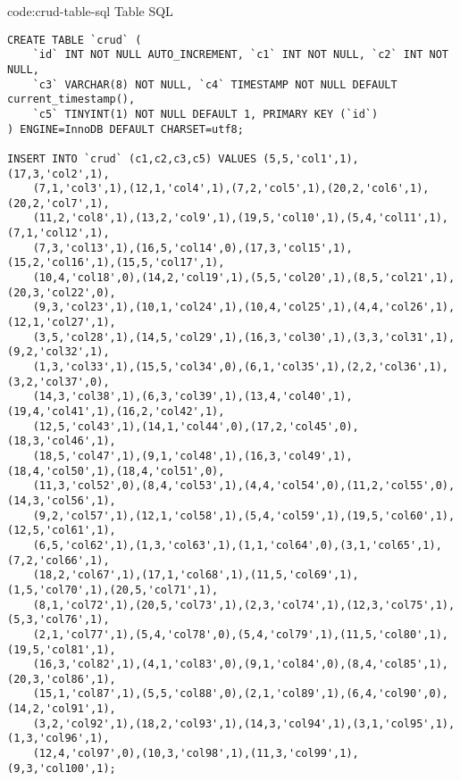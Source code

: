 \begin{codeenv}{code:crud-table-sql}{ Table SQL}\begin{verbatim}
CREATE TABLE `crud` (
    `id` INT NOT NULL AUTO_INCREMENT, `c1` INT NOT NULL, `c2` INT NOT NULL,
    `c3` VARCHAR(8) NOT NULL, `c4` TIMESTAMP NOT NULL DEFAULT current_timestamp(),
	`c5` TINYINT(1) NOT NULL DEFAULT 1, PRIMARY KEY (`id`)
) ENGINE=InnoDB DEFAULT CHARSET=utf8;

INSERT INTO `crud` (c1,c2,c3,c5) VALUES (5,5,'col1',1),(17,3,'col2',1),
    (7,1,'col3',1),(12,1,'col4',1),(7,2,'col5',1),(20,2,'col6',1),(20,2,'col7',1),
    (11,2,'col8',1),(13,2,'col9',1),(19,5,'col10',1),(5,4,'col11',1),(7,1,'col12',1),
    (7,3,'col13',1),(16,5,'col14',0),(17,3,'col15',1),(15,2,'col16',1),(15,5,'col17',1),
    (10,4,'col18',0),(14,2,'col19',1),(5,5,'col20',1),(8,5,'col21',1),(20,3,'col22',0),
    (9,3,'col23',1),(10,1,'col24',1),(10,4,'col25',1),(4,4,'col26',1),(12,1,'col27',1),
    (3,5,'col28',1),(14,5,'col29',1),(16,3,'col30',1),(3,3,'col31',1),(9,2,'col32',1),
    (1,3,'col33',1),(15,5,'col34',0),(6,1,'col35',1),(2,2,'col36',1),(3,2,'col37',0),
    (14,3,'col38',1),(6,3,'col39',1),(13,4,'col40',1),(19,4,'col41',1),(16,2,'col42',1),
    (12,5,'col43',1),(14,1,'col44',0),(17,2,'col45',0),(18,3,'col46',1),
    (18,5,'col47',1),(9,1,'col48',1),(16,3,'col49',1),(18,4,'col50',1),(18,4,'col51',0),
    (11,3,'col52',0),(8,4,'col53',1),(4,4,'col54',0),(11,2,'col55',0),(14,3,'col56',1),
    (9,2,'col57',1),(12,1,'col58',1),(5,4,'col59',1),(19,5,'col60',1),(12,5,'col61',1),
    (6,5,'col62',1),(1,3,'col63',1),(1,1,'col64',0),(3,1,'col65',1),(7,2,'col66',1),
    (18,2,'col67',1),(17,1,'col68',1),(11,5,'col69',1),(1,5,'col70',1),(20,5,'col71',1),
    (8,1,'col72',1),(20,5,'col73',1),(2,3,'col74',1),(12,3,'col75',1),(5,3,'col76',1),
    (2,1,'col77',1),(5,4,'col78',0),(5,4,'col79',1),(11,5,'col80',1),(19,5,'col81',1),
    (16,3,'col82',1),(4,1,'col83',0),(9,1,'col84',0),(8,4,'col85',1),(20,3,'col86',1),
    (15,1,'col87',1),(5,5,'col88',0),(2,1,'col89',1),(6,4,'col90',0),(14,2,'col91',1),
    (3,2,'col92',1),(18,2,'col93',1),(14,3,'col94',1),(3,1,'col95',1),(1,3,'col96',1),
    (12,4,'col97',0),(10,3,'col98',1),(11,3,'col99',1),(9,3,'col100',1);
\end{verbatim}
\end{codeenv}

